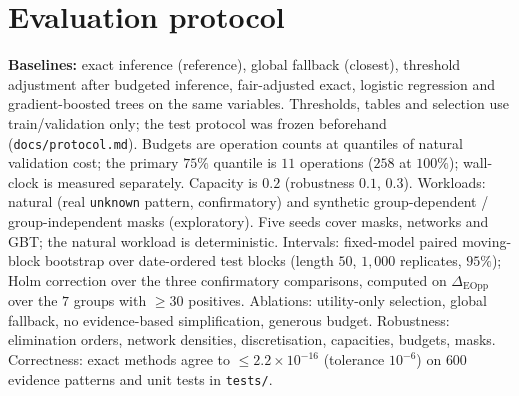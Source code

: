 \documentclass[11pt,a4paper]{article}
\begin{document}
\section{Evaluation protocol}
\textbf{Baselines:} exact inference (reference), global fallback (closest), threshold adjustment after budgeted inference, fair-adjusted exact, logistic regression and gradient-boosted trees on the same variables. Thresholds, tables and selection use train/validation only; the test protocol was frozen beforehand (\texttt{docs/protocol.md}). Budgets are operation counts at quantiles of natural validation cost; the primary $75\%$ quantile is $11$ operations ($258$ at $100\%$); wall-clock is measured separately. Capacity is $0.2$ (robustness $0.1$, $0.3$). Workloads: natural (real \texttt{unknown} pattern, confirmatory) and synthetic group-dependent / group-independent masks (exploratory). Five seeds cover masks, networks and GBT; the natural workload is deterministic. Intervals: fixed-model paired moving-block bootstrap over date-ordered test blocks (length $50$, $1{,}000$ replicates, $95\%$); Holm correction over the three confirmatory comparisons, computed on $\Delta_{\mathrm{EOpp}}$ over the $7$ groups with $\ge30$ positives. Ablations: utility-only selection, global fallback, no evidence-based simplification, generous budget. Robustness: elimination orders, network densities, discretisation, capacities, budgets, masks. Correctness: exact methods agree to $\le2.2\times10^{-16}$ (tolerance $10^{-6}$) on $600$ evidence patterns and unit tests in \texttt{tests/}.
\end{document}
